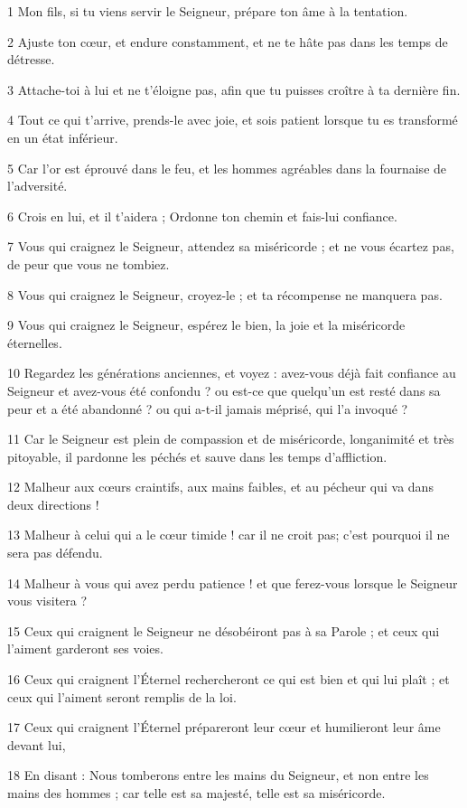 \par 1 Mon fils, si tu viens servir le Seigneur, prépare ton âme à la tentation.
\par 2 Ajuste ton cœur, et endure constamment, et ne te hâte pas dans les temps de détresse.
\par 3 Attache-toi à lui et ne t'éloigne pas, afin que tu puisses croître à ta dernière fin.
\par 4 Tout ce qui t'arrive, prends-le avec joie, et sois patient lorsque tu es transformé en un état inférieur.
\par 5 Car l'or est éprouvé dans le feu, et les hommes agréables dans la fournaise de l'adversité.
\par 6 Crois en lui, et il t'aidera ; Ordonne ton chemin et fais-lui confiance.
\par 7 Vous qui craignez le Seigneur, attendez sa miséricorde ; et ne vous écartez pas, de peur que vous ne tombiez.
\par 8 Vous qui craignez le Seigneur, croyez-le ; et ta récompense ne manquera pas.
\par 9 Vous qui craignez le Seigneur, espérez le bien, la joie et la miséricorde éternelles.
\par 10 Regardez les générations anciennes, et voyez : avez-vous déjà fait confiance au Seigneur et avez-vous été confondu ? ou est-ce que quelqu'un est resté dans sa peur et a été abandonné ? ou qui a-t-il jamais méprisé, qui l'a invoqué ?
\par 11 Car le Seigneur est plein de compassion et de miséricorde, longanimité et très pitoyable, il pardonne les péchés et sauve dans les temps d'affliction.
\par 12 Malheur aux cœurs craintifs, aux mains faibles, et au pécheur qui va dans deux directions !
\par 13 Malheur à celui qui a le cœur timide ! car il ne croit pas; c'est pourquoi il ne sera pas défendu.
\par 14 Malheur à vous qui avez perdu patience ! et que ferez-vous lorsque le Seigneur vous visitera ?
\par 15 Ceux qui craignent le Seigneur ne désobéiront pas à sa Parole ; et ceux qui l'aiment garderont ses voies.
\par 16 Ceux qui craignent l'Éternel rechercheront ce qui est bien et qui lui plaît ; et ceux qui l'aiment seront remplis de la loi.
\par 17 Ceux qui craignent l'Éternel prépareront leur cœur et humilieront leur âme devant lui,
\par 18 En disant : Nous tomberons entre les mains du Seigneur, et non entre les mains des hommes ; car telle est sa majesté, telle est sa miséricorde.

